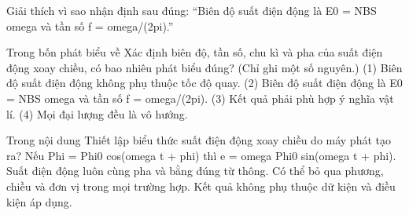 \begin{bt}
Giải thích vì sao nhận định sau đúng: “Biên độ suất điện động là E0 = NBS omega và tần số f = omega/(2pi).”
\end{bt}

\begin{ex}
Trong bốn phát biểu về Xác định biên độ, tần số, chu kì và pha của suất điện động xoay chiều, có bao nhiêu phát biểu đúng? (Chỉ ghi một số nguyên.) (1) Biên độ suất điện động không phụ thuộc tốc độ quay. (2) Biên độ suất điện động là E0 = NBS omega và tần số f = omega/(2pi). (3) Kết quả phải phù hợp ý nghĩa vật lí. (4) Mọi đại lượng đều là vô hướng.
\end{ex}

\begin{ex}
Trong nội dung Thiết lập biểu thức suất điện động xoay chiều do máy phát tạo ra?
\choice
{\True Nếu Phi = Phi0 cos(omega t + phi) thì e = omega Phi0 sin(omega t + phi).}
{Suất điện động luôn cùng pha và bằng đúng từ thông.}
{Có thể bỏ qua phương, chiều và đơn vị trong mọi trường hợp.}
{Kết quả không phụ thuộc dữ kiện và điều kiện áp dụng.}
\end{ex}

